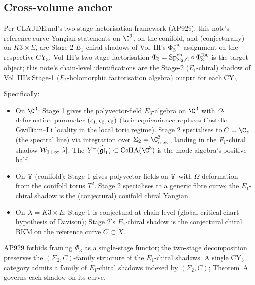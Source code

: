 \subsection{Cross-volume anchor}
\label{w17:subsec:cross-volume-anchor}

Per CLAUDE.md's two-stage factorisation framework (AP929), this note's
reference-curve Yangian statements on $\C^3$, on the conifold, and
(conjecturally) on $K3 \times E$, are Stage-2 $E_1$-chiral shadows of Vol~III's
$\Phi^{\mathrm{FA}}_3$-assignment on the respective CY$_3$. Vol~III's two-stage
factorisation $\Phi_3 = \mathrm{Sp}^{\mathrm{ch}}_{\Sigma_2, C} \circ \Phi^{\mathrm{FA}}_3$ is the target
object; this note's chain-level identifications are the Stage-2 ($E_1$-chiral)
shadow of Vol~III's Stage-1 ($E_3$-holomorphic factorisation algebra) output
for each CY$_3$.

Specifically:
\begin{itemize}
\item On $\C^3$: Stage 1 gives the polyvector-field $E_3$-algebra on $\C^3$
with $\Omega$-deformation parameter $(\epsilon_1, \epsilon_2, \epsilon_3)$ (toric
equivariance replaces Costello--Gwilliam--Li locality in the local toric
regime). Stage 2 specialises to $C = \C_z$ (the spectral line) via integration
over $\Sigma_2 = \C^2_{\eps_1, \eps_2}$, landing in the $E_1$-chiral shadow
$\mathcal{W}_{1+\infty}[\lambda]$. The $Y^+(\gghone) \subset \CoHA(\C^3)$ is the mode
algebra's positive half.
\item On $\mathbb{Y}$ (conifold): Stage 1 gives polyvector fields on $\mathbb{Y}$ with
$\Omega$-deformation from the conifold torus $T^2$. Stage 2 specialises to
a generic fibre curve; the $E_1$-chiral shadow is the (conjectural) conifold
chiral Yangian.
\item On $X = K3 \times E$: Stage 1 is conjectural at chain level
(global-critical-chart hypothesis of Davison); Stage 2's $E_1$-chiral shadow is
the conjectural chiral BKM on the reference curve $C \subset X$.
\end{itemize}

AP929 forbids framing $\Phi_3$ as a single-stage functor; the two-stage
decomposition preserves the $(\Sigma_2, C)$-family structure of the
$E_1$-chiral shadows. A single CY$_3$ category admits a family of $E_1$-chiral
shadows indexed by $(\Sigma_2, C)$; Theorem~A governs each shadow on its curve.


